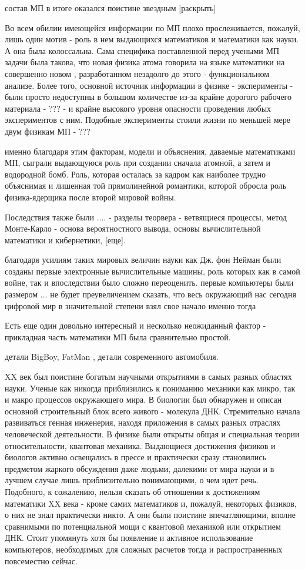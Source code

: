 состав МП в итоге оказался поистине звездным [раскрыть]

Во всем обилии имеющейся информации по МП плохо прослеживается, пожалуй, лишь один мотив - роль в нем выдающихся математиков и математики как науки.
А она была колоссальна.
Сама специфика поставленной перед учеными МП задачи была такова, что новая физика атома говорила на языке математики на совершенно новом , разработанном незадолго до этого - функциональном анализе.
Более того, основной источник информации в физике - эксперименты - были просто недоступны в большом количестве из-за крайне дорогого рабочего материала - ??? - 
и крайне высокого уровня опасности проведения любых экспериментов с ним. Подобные эксперименты стоили жизни по меньшей мере двум физикам МП - ???

именно благодаря этим факторам, модели и объяснения, даваемые математиками МП, сыграли выдающуюся роль при создании сначала атомной, а затем и водородной бомб. 
Роль, которая осталась за кадром как наиболее трудно объяснимая и лишенная той прямолинейной романтики, которой обросла роль физика-ядерщика после второй мировой войны.

Последствия также были .... - разделы теорвера - ветвящиеся процессы, метод Монте-Карло - основа вероятностного вывода, основы вычислительной математики и кибернетики, [еще].

благодаря усилиям таких мировых величин науки как Дж. фон Нейман были созданы первые электронные вычислительные машины, роль которых как в самой войне, так и впоследствии было сложно переоценить.
первые компьютеры были размером ...
не будет преувеличением сказать, что весь окружающий нас сегодня цифровой мир в значительной степени взял свое начало именно тогда
  
Есть еще один довольно интересный и несколько неожиданный фактор - прикладная часть математики МП была сравнительно простой. 

детали BigBoy, FatMan , детали современного автомобиля.


XX век был поистине богатым научными открытиями в самых разных областях науки. Ученые как никогда приблизились к пониманию механики как микро, так и макро процессов окружающего мира. В биологии был обнаружен и описан основной строительный блок всего живого - молекула ДНК. Стремительно начала развиваться генная инженерия, находя приложения в самых разных отраслях человеческой деятельности. В физике были открыты общая и специальная теории относительности, квантовая механика. Выдающиеся достижения физиков и биологов активно освещались в прессе и практически сразу становились предметом жаркого обсуждения даже людьми, далекими от мира науки и в лучшем случае лишь приблизительно понимающими, о чем идет речь. 
Подобного, к сожалению, нельзя сказать об отношении к достижениям математики XX века - кроме самих математиков и, пожалуй, некоторых физиков, о них не знал практически никто. А они были поистине впечатляющими, вполне сравнимыми по потенциальной мощи с квантовой механикой или открытием ДНК. Стоит упомянуть хотя бы появление и активное использование компьютеров, необходимых для сложных расчетов тогда и распространенных повсеместно сейчас.

